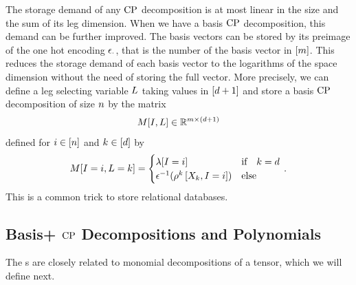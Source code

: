 \begin{remark}
    \label{rem:matStorageBas}
    The storage demand of any $\mathrm{CP}$ decomposition is at most linear in the size and the sum of its leg dimension.
    When we have a basis $\mathrm{CP}$ decomposition, this demand can be further improved.
    The basis vectors can be stored by its preimage of the one hot encoding $\epsilon_{\cdot}$, that is the number of the basis vector in $[m]$.
    This reduces the storage demand of each basis vector to the logarithms of the space dimension without the need of storing the full vector.
    More precisely, we can define a leg selecting variable $L$ taking values in $[d+1]$ and store a basis $\mathrm{CP}$ decomposition of size $n$ by the matrix
    \begin{align*}
        M[I,L] \in \mathbb{R}^{m \times (d+1)}
    \end{align*}
    defined for $i\in[n]$ and $k\in[d]$ by
    \begin{align*}
        \matrixat{\inddecvar,\selvariable=\atomenumerator} =
        \begin{cases}
            \scalarcoreat{\inddecvar} & \ifspace \atomenumerator = \catorder \\
            \invonehotmapof{\legcoreofat{\atomenumerator}{\catvariableof{\atomenumerator},\indexeddecvariable}} & \text{else} \\%
        \end{cases} \, .
    \end{align*}
    This is a common trick to store relational databases.
\end{remark}


\subsection{Basis+ $\mathrm{CP}$ Decompositions and Polynomials}

The \basplusDecomposition{}s are closely related to monomial decompositions of a tensor, which we will define next.

